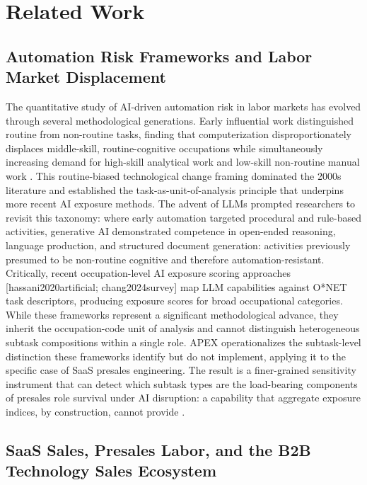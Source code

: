 \documentclass[10pt, conference]{IEEEtran}
\begin{document}
\section{Related Work}

\label{sec:related_work}

\subsection{Automation Risk Frameworks and Labor Market Displacement}

\label{sec:automation_risk_frameworks_and_labor_mar}

The quantitative study of AI-driven automation risk in labor markets has evolved through several methodological generations. Early influential work distinguished routine from non-routine tasks, finding that computerization disproportionately displaces middle-skill, routine-cognitive occupations while simultaneously increasing demand for high-skill analytical work and low-skill non-routine manual work \cite{santana2020future}. This routine-biased technological change framing dominated the 2000s literature and established the task-as-unit-of-analysis principle that underpins more recent AI exposure methods. The advent of LLMs prompted researchers to revisit this taxonomy: where early automation targeted procedural and rule-based activities, generative AI demonstrated competence in open-ended reasoning, language production, and structured document generation: activities previously presumed to be non-routine cognitive and therefore automation-resistant. Critically, recent occupation-level AI exposure scoring approaches [hassani2020artificial; chang2024survey] map LLM capabilities against O*NET task descriptors, producing exposure scores for broad occupational categories. While these frameworks represent a significant methodological advance, they inherit the occupation-code unit of analysis and cannot distinguish heterogeneous subtask compositions within a single role. APEX operationalizes the subtask-level distinction these frameworks identify but do not implement, applying it to the specific case of SaaS presales engineering. The result is a finer-grained sensitivity instrument that can detect which subtask types are the load-bearing components of presales role survival under AI disruption: a capability that aggregate exposure indices, by construction, cannot provide \cite{martinezplumed2020futures}.

\subsection{SaaS Sales, Presales Labor, and the B2B Technology Sales Ecosystem}
\end{document}
